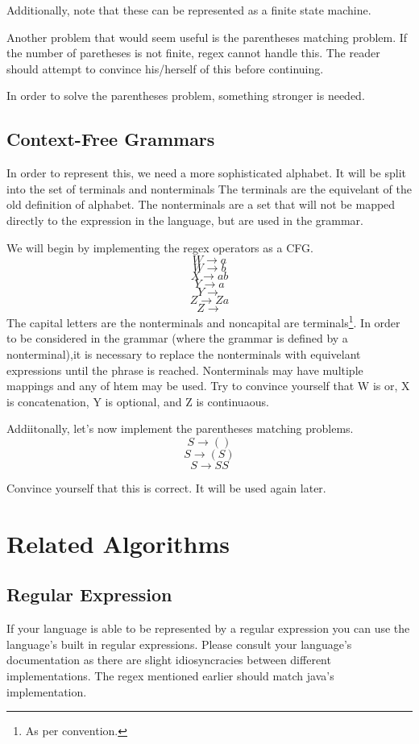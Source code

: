 Additionally, note that these can be represented as a finite state
machine.

Another problem that would seem useful is the parentheses matching
problem. If the number of paretheses is not finite, regex cannot
handle this. The reader should attempt to convince his/herself of this
before continuing.

In order to solve the parentheses problem, something stronger is
needed.

\subsection{Context-Free Grammars}

In order to represent this, we need a more sophisticated
alphabet. It will be split into the set of  terminals and nonterminals
The terminals are the equivelant of the old definition of
alphabet. The nonterminals are a set that will not be mapped directly
to the expression in the language, but are used in the grammar.

We will begin by implementing the regex operators as a CFG.
$$W \rightarrow a$$
$$W \rightarrow b$$
$$X \rightarrow ab$$
$$Y \rightarrow a$$
$$Y \rightarrow $$
$$Z \rightarrow Za$$
$$Z \rightarrow $$
The capital letters are the nonterminals and noncapital are
terminals\footnote{As per convention.}. In order to be considered in the grammar
(where the grammar is defined by a nonterminal),it is necessary to
replace the nonterminals with equivelant expressions until the phrase
is reached. Nonterminals may have multiple mappings and any of htem
may be used. Try to convince yourself that W is or, X is
concatenation, Y is optional, and Z is continuaous.

Addiitonally, let's now implement the parentheses matching problems.
$$S \rightarrow ()$$
$$S \rightarrow (S)$$
$$S \rightarrow SS$$

Convince yourself that this is correct. It will be used again later.

\section{Related Algorithms}

\subsection{Regular Expression}

If your language is able to be represented by a regular expression you
can use the language's built in regular expressions. Please consult
your language's documentation as there are slight idiosyncracies
between different implementations. The regex mentioned earlier should
match java's implementation.

